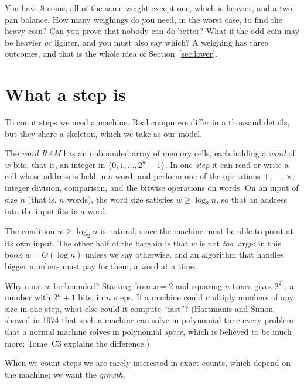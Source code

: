 \begin{think}
You have $8$ coins, all of the same weight except one, which is heavier, and a two-pan balance. How many weighings do you need, in the
worst case, to find the heavy coin? Can you prove that nobody can do better? What if the odd coin may be heavier \emph{or} lighter, and
you must also say which? A weighing has three outcomes, and that is the whole idea of Section~\ref{sec:lower}.
\end{think}

\section{What a step is}\label{sec:models}

To count steps we need a machine. Real computers differ in a thousand details, but they share a skeleton, which we take as our model.

\begin{definition}\label{def:wordram}
The \emph{word RAM} has an unbounded array of memory cells, each holding a \emph{word} of $w$ bits, that is, an integer in
$\{0,1,\dots,2^w-1\}$. In one \emph{step} it can read or write a cell whose address is held in a word, and perform one of the
operations $+$, $-$, $\times$, integer division, comparison, and the bitwise operations on words. On an input of size $n$
(that is, $n$ words), the word size satisfies $w\ge\log_2 n$, so that an address into the input fits in a word.
\end{definition}

The condition $w\ge\log_2 n$ is natural, since the machine must be able to point at its own input. The other half of the bargain is
that $w$ is not \emph{too} large: in this book $w=O(\log n)$ unless we say otherwise, and an algorithm that handles bigger numbers must
pay for them, a word at a time.

\begin{think}
Why must $w$ be bounded? Starting from $x=2$ and squaring $n$ times gives $2^{2^n}$, a number with $2^n+1$ bits, in $n$ steps. If
a machine could multiply numbers of any size in one step, what else could it compute ``fast''? (Hartmanis and Simon showed in 1974
that such a machine can solve in polynomial time every problem that a normal machine solves in polynomial \emph{space}, which is
believed to be much more; Tome~C3 explains the difference.)
\end{think}

When we count steps we are rarely interested in exact counts, which depend on the machine; we want the \emph{growth}.

